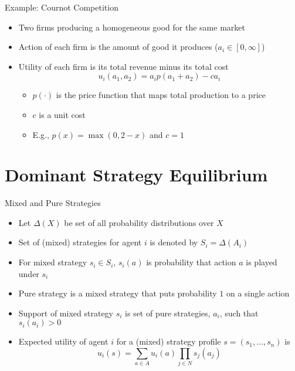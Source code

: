 \documentclass[11pt,aspectratio=169,handout]{beamer}
\begin{document}
  \begin{frame}{Example: Cournot Competition}
   \begin{itemize}
    \item Two firms producing a homogeneous good for the same market
    \item Action of each firm is the amount of good it produces ($a_i \in [0,\infty]$)
    \item Utility of each firm is its total revenue minus its total cost
     $$u_i(a_1,a_2) = a_i p(a_1 + a_2) - c a_i$$
    \begin{itemize}[<2->]
     \item $p(\cdot)$ is the price function that maps total production to a price
     \item$c$ is a unit cost
     \item E.g., $p(x) = \max(0, 2 - x)$ and $c = 1$
    \end{itemize}
   \end{itemize}
  \end{frame}
  
 \section{Dominant Strategy Equilibrium}
  \begin{frame}{Mixed and Pure Strategies}
   \begin{itemize}[<+->]
    \setlength{\itemsep}{0.56em}
    \item Let $\Delta(X)$ be set of all probability distributions over $X$
    \item Set of \alert{(mixed) strategies} for agent $i$ is denoted by $S_i = \Delta(A_i)$
    \item For mixed strategy $s_i \in S_i$, $s_i(a)$ is probability that action $a$ is played under $s_i$
    \item \alert{Pure strategy} is a mixed strategy that puts probability $1$ on a single action
    \item \alert{Support} of mixed strategy $s_i$ is set of pure strategies, $a_i$, such that $s_i(a_i) > 0$
    \item Expected utility of agent $i$ for a (mixed) \alert{strategy profile} $s = (s_1,\dots,s_n)$ is
     $$u_i(s) = \sum_{a\in A} u_i(a) \prod_{j\in N}s_j(a_j)$$ 
   \end{itemize}
  \end{frame}
  
\end{document}
